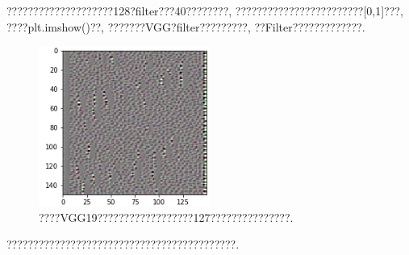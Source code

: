 \documentclass[lang=cn,11pt]{elegantpaper}
\begin{document}
????????????????????128?filter???40????????, ????????????????????????[0,1]???, ????plt.imshow()??, ???????VGG?filter?????????, ??Filter?????????????. 
\begin{figure}[htbp]
	\centering
  \hspace{-30pt}\includegraphics[width=0.5\textwidth]{block2_conv1_127.png}
  \tiny
  \caption{????VGG19??????????????????127???????????????.\label{fig:pretrain-singal}}
\end{figure}

\normalsize
???????????????????????????????????????????.
\end{document}
